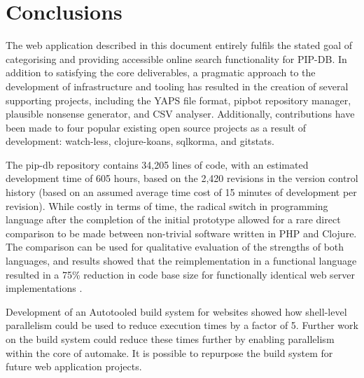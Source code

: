 \chapter{Conclusions}\label{chap:conclusions}


The web application described in this document entirely fulfils the
stated goal of categorising and providing accessible online search
functionality for PIP-DB. In addition to satisfying the core
deliverables, a pragmatic approach to the development of
infrastructure and tooling has resulted in the creation of several
supporting projects, including the YAPS file format, pipbot repository
manager, plausible nonsense generator, and CSV analyser. Additionally,
contributions have been made to four popular existing open source
projects as a result of development: watch-less, clojure-koans,
sqlkorma, and gitstats.

The pip-db repository contains 34,205 lines of code, with an estimated
development time of 605 hours, based on the 2,420 revisions in the
version control history (based on an assumed average time cost of 15
minutes of development per revision). While costly in terms of time,
the radical switch in programming language after the completion of the
initial prototype allowed for a rare direct comparison to be made
between non-trivial software written in PHP and Clojure. The
comparison can be used for qualitative evaluation of the strengths of
both languages, and results showed that the reimplementation in a
functional language resulted in a 75\% reduction in code base size for
functionally identical web server implementations
\cite{cummins2014migrating}.

Development of an Autotooled build system for websites showed how
shell-level parallelism could be used to reduce execution times by a
factor of 5. Further work on the build system could reduce these times
further by enabling parallelism within the core of automake. It is
possible to repurpose the build system for future web application
projects.


